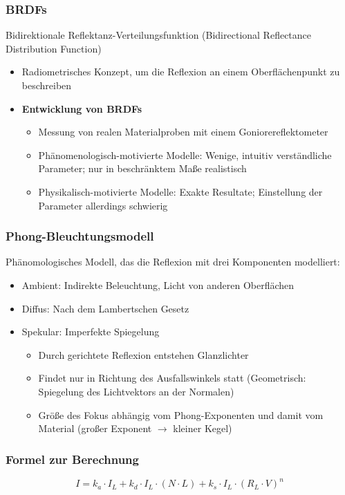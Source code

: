 \subsubsection{BRDFs}
Bidirektionale Reflektanz-Verteilungsfunktion (Bidirectional Reflectance Distribution Function)
\begin{itemize}
	\item Radiometrisches Konzept, um die Reflexion an einem Oberflächenpunkt zu beschreiben
	\item \textbf{Entwicklung von BRDFs}
	\begin{itemize}
		\item Messung von realen Materialproben mit einem Goniorereflektometer
		\item Phänomenologisch-motivierte Modelle: Wenige, intuitiv verständliche Parameter; nur in beschränktem Maße realistisch
		\item Physikalisch-motivierte Modelle: Exakte Resultate; Einstellung der Parameter allerdings schwierig
	\end{itemize}
\end{itemize}


\subsubsection{Phong-Bleuchtungsmodell}
Phänomologisches Modell, das die Reflexion mit drei Komponenten modelliert:
\begin{itemize}
	\item Ambient: Indirekte Beleuchtung, Licht von anderen Oberflächen
	\item Diffus: Nach dem Lambertschen Gesetz
	\item Spekular: Imperfekte Spiegelung
	\begin{itemize}
		\item Durch gerichtete Reflexion entstehen Glanzlichter
		\item Findet nur in Richtung des Ausfallswinkels statt (Geometrisch: Spiegelung des Lichtvektors an der Normalen)
		\item Größe des Fokus abhängig vom Phong-Exponenten und damit vom Material (großer Exponent \(\rightarrow\) kleiner Kegel)
	\end{itemize}
\end{itemize}

\subsubsection{Formel zur Berechnung}
\[I = k_a\cdot I_L + k_d\cdot I_L \cdot (N \cdot L) + k_s\cdot I_L \cdot (R_L \cdot V)^n\]

